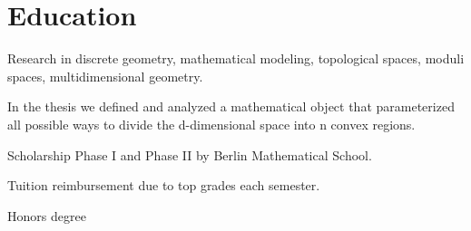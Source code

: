 \documentclass[]{plushcv}
\begin{document}
\begin{minipage}[t]{0.70\textwidth}


\section{Education} 
\begin{tightemize}
\item Research in discrete geometry, mathematical modeling, topological spaces, moduli spaces, multidimensional geometry.
\item In the thesis we defined and analyzed a mathematical object that parameterized all possible ways to divide the d-dimensional space into n convex regions.
  \item Scholarship Phase I and Phase II by Berlin Mathematical School.\end{tightemize}
\sectionsep

\begin{tightemize}
\item Tuition reimbursement due to top grades each semester.\\
\item Honors degree
\end{tightemize}






\end{minipage}
\end{document}

